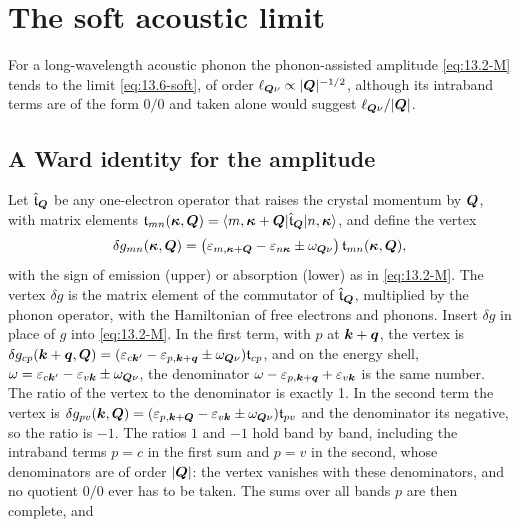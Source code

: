 \section{The soft acoustic limit}\label{app:D.37}

For a long-wavelength acoustic phonon the phonon-assisted amplitude \cref{eq:13.2-M} tends to the limit \cref{eq:13.6-soft}, of order $\ell_{\bm{Q}\nu} \propto |\bm{Q}|^{-1/2}$, although its intraband terms are of the form $0/0$ and taken alone would suggest $\ell_{\bm{Q}\nu}/|\bm{Q}|$.

\subsection*{A Ward identity for the amplitude}

Let $\hat{\mathfrak{t}}_{\bm{Q}}$ be any one-electron operator that raises the crystal momentum by $\bm{Q}$, with matrix elements $\mathfrak{t}_{mn}(\bm{\kappa},\bm{Q}) = \langle m,\bm{\kappa}+\bm{Q}|\hat{\mathfrak{t}}_{\bm{Q}}|n,\bm{\kappa}\rangle$, and define the vertex
\begin{equation}
  \delta g_{mn}(\bm{\kappa},\bm{Q}) = \bigl(\varepsilon_{m,\bm{\kappa}+\bm{Q}} - \varepsilon_{n\bm{\kappa}} \pm \omega_{\bm{Q}\nu}\bigr)\,\mathfrak{t}_{mn}(\bm{\kappa},\bm{Q}) ,
  \label{eq:D.37-dg}
\end{equation}
with the sign of emission (upper) or absorption (lower) as in \cref{eq:13.2-M}. The vertex $\delta g$ is the matrix element of the commutator of $\hat{\mathfrak{t}}_{\bm{Q}}$, multiplied by the phonon operator, with the Hamiltonian of free electrons and phonons. Insert $\delta g$ in place of $g$ into \cref{eq:13.2-M}. In the first term, with $p$ at $\bm{k}+\bm{q}$, the vertex is $\delta g_{cp}(\bm{k}+\bm{q},\bm{Q}) = (\varepsilon_{c\bm{k}'} - \varepsilon_{p,\bm{k}+\bm{q}} \pm \omega_{\bm{Q}\nu})\mathfrak{t}_{cp}$, and on the energy shell, $\omega = \varepsilon_{c\bm{k}'} - \varepsilon_{v\bm{k}} \pm \omega_{\bm{Q}\nu}$, the denominator $\omega - \varepsilon_{p,\bm{k}+\bm{q}} + \varepsilon_{v\bm{k}}$ is the same number. The ratio of the vertex to the denominator is exactly 1. In the second term the vertex is $\delta g_{pv}(\bm{k},\bm{Q}) = (\varepsilon_{p,\bm{k}+\bm{Q}} - \varepsilon_{v\bm{k}} \pm \omega_{\bm{Q}\nu})\mathfrak{t}_{pv}$ and the denominator its negative, so the ratio is $-1$. The ratios $1$ and $-1$ hold band by band, including the intraband terms $p = c$ in the first sum and $p = v$ in the second, whose denominators are of order $|\bm{Q}|$: the vertex vanishes with these denominators, and no quotient $0/0$ ever has to be taken. The sums over all bands $p$ are then complete, and
